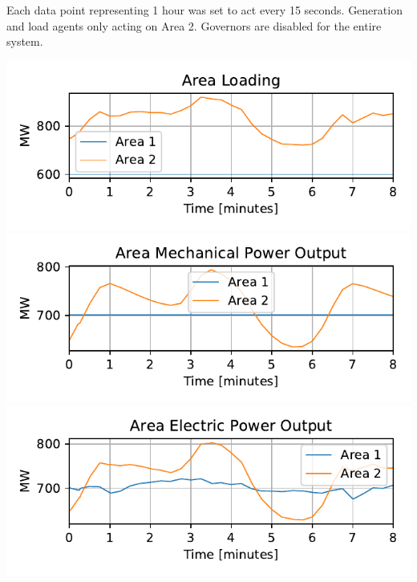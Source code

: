 \documentclass[12pt]{article}
\begin{document}
\begin{multicols}{2}
Each data point representing 1 hour was set to act every 15 seconds.
Generation and load agents only acting on Area 2.
Governors are disabled for the entire system.

\includegraphics[width=\linewidth]{figures/sixMachineDailyCTRLAreaPload}
\includegraphics[width=\linewidth]{figures/sixMachineDailyCTRLAreaPm}
\includegraphics[width=\linewidth]{figures/sixMachineDailyCTRLAreaPe}

\end{multicols}
\end{document}
